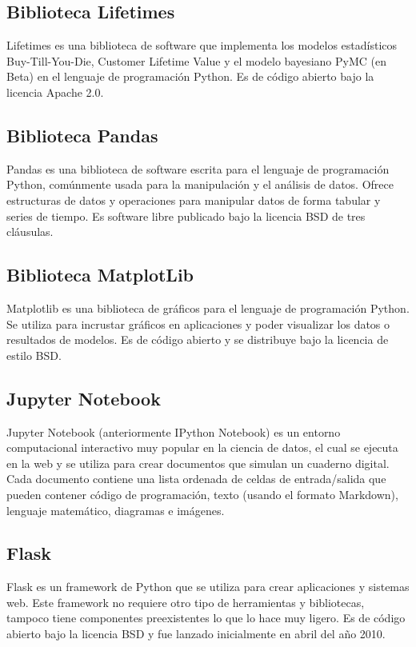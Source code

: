 \subsection{Biblioteca Lifetimes}

Lifetimes es una biblioteca de software que implementa los modelos estadísticos Buy-Till-You-Die, Customer Lifetime Value y el modelo bayesiano PyMC (en Beta) en el lenguaje de programación Python. Es de código abierto bajo la licencia Apache 2.0.
	
\subsection{Biblioteca Pandas}

Pandas es una biblioteca de software escrita para el lenguaje de programación Python, comúnmente usada para la manipulación y el análisis de datos. Ofrece estructuras de datos y operaciones para manipular datos de forma tabular y series de tiempo. Es software libre publicado bajo la licencia BSD de tres cláusulas.
	
\subsection{Biblioteca MatplotLib}

Matplotlib es una biblioteca de gráficos para el lenguaje de programación Python. Se utiliza para incrustar gráficos en aplicaciones y poder visualizar los datos o resultados de modelos. Es de código abierto y se distribuye bajo la licencia de estilo BSD.
	
\subsection{Jupyter Notebook}

Jupyter Notebook (anteriormente IPython Notebook) es un entorno computacional interactivo muy popular en la ciencia de datos, el cual se ejecuta en la web y se utiliza para crear documentos que simulan un cuaderno digital. Cada documento contiene una lista ordenada de celdas de entrada/salida que pueden contener código de programación, texto (usando el formato Markdown), lenguaje matemático, diagramas e imágenes. 
	
\subsection{Flask}

Flask es un framework de Python que se utiliza para crear aplicaciones y sistemas web. Este framework no requiere otro tipo de herramientas y bibliotecas, tampoco tiene componentes preexistentes lo que lo hace muy ligero. Es de código abierto bajo la licencia BSD y fue lanzado inicialmente en abril del año 2010.

